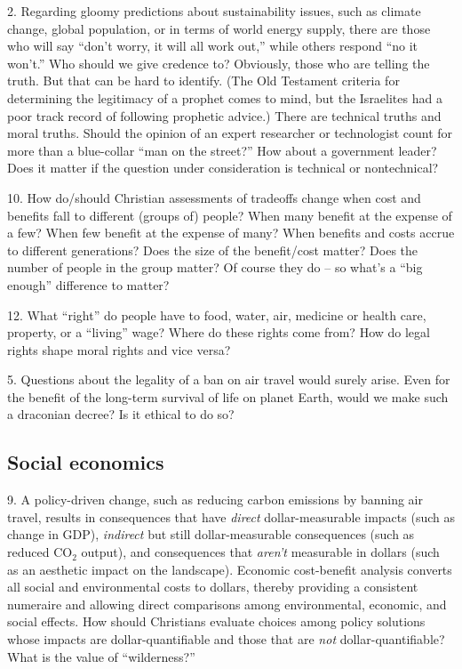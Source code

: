 \documentclass[12pt]{article}
\begin{document}
2. Regarding gloomy predictions about sustainability issues, such as climate change, global population,
or in terms of world energy supply, there are those who will say ``don't worry, it will all work out,'' while
others respond ``no it won't.'' Who should we give credence to? Obviously, those who are telling the truth. But that can
be hard to identify. (The Old Testament criteria for determining the legitimacy of a prophet comes to mind, but the
Israelites had a poor track record of following prophetic advice.) There are technical truths and moral truths. Should
the opinion of an expert researcher or technologist count for more than a blue-collar ``man on the street?'' How about a
government leader? Does it matter if the question under consideration is technical or nontechnical?

10. How do/should Christian assessments of tradeoffs change when cost and benefits fall to different (groups of) people?
When many benefit at the expense of a few? When few benefit at the expense of many? When benefits and costs accrue to
different generations? Does the size of the benefit/cost matter? Does the number of people in the group matter? 
Of course they do -- so what’s a ``big enough'' difference to matter?

12. What ``right'' do people have to food, water, air, medicine or health care, property, or a ``living'' wage? 
Where do these rights come from? How do legal rights shape moral rights and vice versa?

5. Questions about the legality of a ban on air travel would surely arise. Even for the benefit of the long-term survival
of life on planet Earth, would we make such a draconian decree? Is it ethical to do so?


\subsection{Social economics}

9. A policy-driven change, such as reducing carbon emissions by banning air travel, results in consequences that have
\emph{direct} dollar-measurable impacts (such as change in GDP), \emph{indirect} but still dollar-measurable
consequences (such as reduced CO$_2$ output), and consequences that \emph{aren't} measurable in dollars (such as an
aesthetic impact on the landscape). Economic cost-benefit analysis converts all social and environmental costs to
dollars, thereby providing a consistent numeraire and allowing direct comparisons among environmental, economic, and
social effects. How should Christians evaluate choices among policy solutions whose impacts are dollar-quantifiable and
those that are \emph{not} dollar-quantifiable? What is the value of ``wilderness?''
\end{document}
